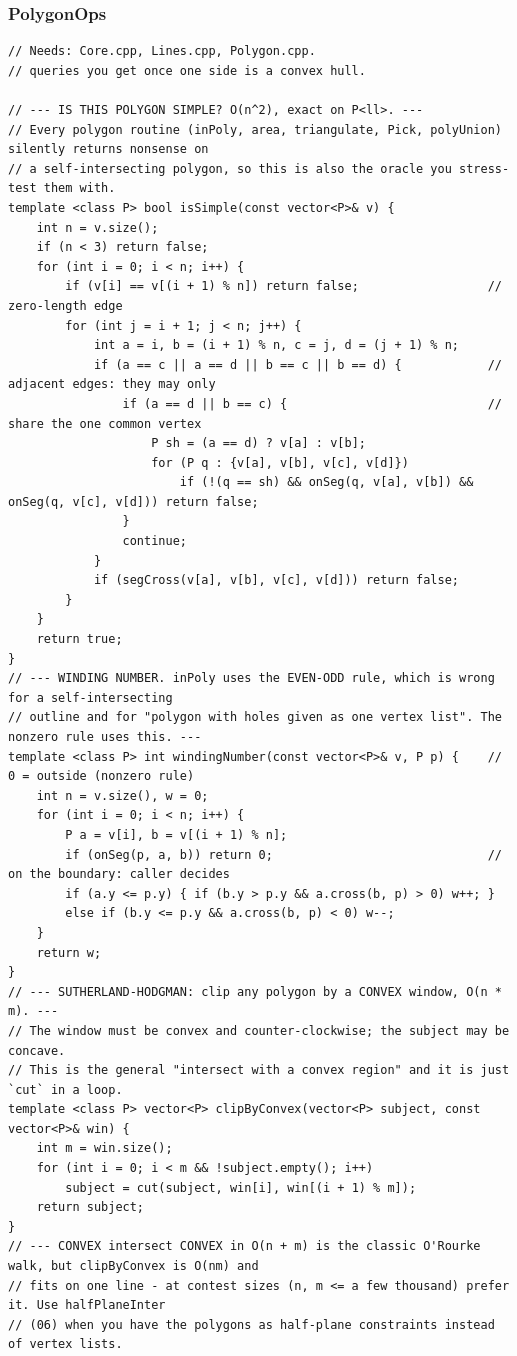 \documentclass[9pt,a4paper,twocolumn]{extarticle}
\begin{document}
\subsubsection{PolygonOps}
\nopagebreak
\begin{lstlisting}
// Needs: Core.cpp, Lines.cpp, Polygon.cpp.
// queries you get once one side is a convex hull.

// --- IS THIS POLYGON SIMPLE? O(n^2), exact on P<ll>. ---
// Every polygon routine (inPoly, area, triangulate, Pick, polyUnion) silently returns nonsense on
// a self-intersecting polygon, so this is also the oracle you stress-test them with.
template <class P> bool isSimple(const vector<P>& v) {
    int n = v.size();
    if (n < 3) return false;
    for (int i = 0; i < n; i++) {
        if (v[i] == v[(i + 1) % n]) return false;                  // zero-length edge
        for (int j = i + 1; j < n; j++) {
            int a = i, b = (i + 1) % n, c = j, d = (j + 1) % n;
            if (a == c || a == d || b == c || b == d) {            // adjacent edges: they may only
                if (a == d || b == c) {                            // share the one common vertex
                    P sh = (a == d) ? v[a] : v[b];
                    for (P q : {v[a], v[b], v[c], v[d]})
                        if (!(q == sh) && onSeg(q, v[a], v[b]) && onSeg(q, v[c], v[d])) return false;
                }
                continue;
            }
            if (segCross(v[a], v[b], v[c], v[d])) return false;
        }
    }
    return true;
}
// --- WINDING NUMBER. inPoly uses the EVEN-ODD rule, which is wrong for a self-intersecting
// outline and for "polygon with holes given as one vertex list". The nonzero rule uses this. ---
template <class P> int windingNumber(const vector<P>& v, P p) {    // 0 = outside (nonzero rule)
    int n = v.size(), w = 0;
    for (int i = 0; i < n; i++) {
        P a = v[i], b = v[(i + 1) % n];
        if (onSeg(p, a, b)) return 0;                              // on the boundary: caller decides
        if (a.y <= p.y) { if (b.y > p.y && a.cross(b, p) > 0) w++; }
        else if (b.y <= p.y && a.cross(b, p) < 0) w--;
    }
    return w;
}
// --- SUTHERLAND-HODGMAN: clip any polygon by a CONVEX window, O(n * m). ---
// The window must be convex and counter-clockwise; the subject may be concave.
// This is the general "intersect with a convex region" and it is just `cut` in a loop.
template <class P> vector<P> clipByConvex(vector<P> subject, const vector<P>& win) {
    int m = win.size();
    for (int i = 0; i < m && !subject.empty(); i++)
        subject = cut(subject, win[i], win[(i + 1) % m]);
    return subject;
}
// --- CONVEX intersect CONVEX in O(n + m) is the classic O'Rourke walk, but clipByConvex is O(nm) and
// fits on one line - at contest sizes (n, m <= a few thousand) prefer it. Use halfPlaneInter
// (06) when you have the polygons as half-plane constraints instead of vertex lists.


\end{lstlisting}
\end{document}
